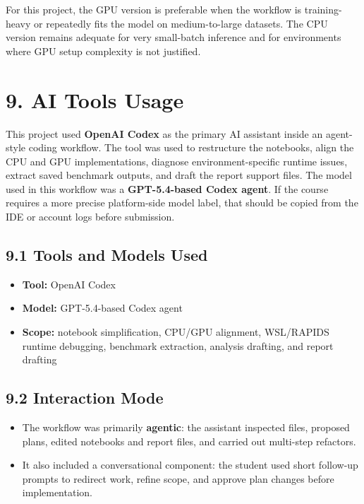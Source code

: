 \documentclass[10pt]{article}
\begin{document}
For this project, the GPU version is preferable when the workflow is training-heavy or repeatedly fits the model on medium-to-large datasets. The CPU version remains adequate for very small-batch inference and for environments where GPU setup complexity is not justified.

\newpage

\section*{9. AI Tools Usage}
This project used \textbf{OpenAI Codex} as the primary AI assistant inside an agent-style coding workflow. The tool was used to restructure the notebooks, align the CPU and GPU implementations, diagnose environment-specific runtime issues, extract saved benchmark outputs, and draft the report support files. The model used in this workflow was a \textbf{GPT-5.4-based Codex agent}. If the course requires a more precise platform-side model label, that should be copied from the IDE or account logs before submission.

\subsection*{9.1 Tools and Models Used}
\begin{itemize}
  \item \textbf{Tool:} OpenAI Codex
  \item \textbf{Model:} GPT-5.4-based Codex agent
  \item \textbf{Scope:} notebook simplification, CPU/GPU alignment, WSL/RAPIDS runtime debugging, benchmark extraction, analysis drafting, and report drafting
\end{itemize}

\subsection*{9.2 Interaction Mode}
\begin{itemize}
  \item The workflow was primarily \textbf{agentic}: the assistant inspected files, proposed plans, edited notebooks and report files, and carried out multi-step refactors.
  \item It also included a conversational component: the student used short follow-up prompts to redirect work, refine scope, and approve plan changes before implementation.
\end{itemize}
\end{document}
